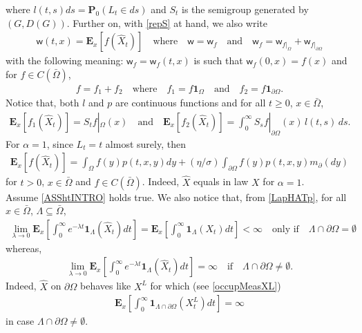 \documentclass[11pt,a4paper]{article}
\begin{document}
where $l(t,s)ds = \mathbf{P}_0(L_t \in ds)$ and $S_t$ is the semigroup generated by $(G, D(G))$. Further on, with \eqref{repS} at hand, we also write
\begin{align}
\label{wXhatLaw} 
\mathsf{w}(t,x) = \mathbf{E}_x[f(\hat{X}_t)] \quad \textrm{where} \quad \mathsf{w}=\mathsf{w}_f \quad \textrm{and} \quad  \mathsf{w}_f = \mathsf{w}_{f|_\Omega} + \mathsf{w}_{f|_{\partial \Omega}}
\end{align}
with the following meaning:  $\mathsf{w}_f=\mathsf{w}_f(t,x)$ is such that $\mathsf{w}_f(0,x) = f(x)$ and for $f \in C(\bar{\Omega})$, 
\begin{align}
\label{repf12}
f = f_1 + f_2 \quad \textrm{where} \quad  f_1 = f \mathbf{1}_\Omega \quad \textrm{and} \quad f_2 = f \mathbf{1}_{\partial \Omega}.
\end{align}
Notice that, both $l$ and $p$ are continuous functions and for all $t\geq 0$, $x \in \bar{\Omega}$,
\begin{align*}
\mathbf{E}_x[f_1(\hat{X}_t)] = S_t f|_{\Omega}(x) \quad \textrm{and} \quad \mathbf{E}_x[f_2(\hat{X}_t)] = \int_0^\infty  S_s f|_{\partial \Omega} (x)\,l(t,s)\, ds.
\end{align*} 
For $\alpha=1$, since $L_t=t$ almost surely, then 
\begin{align*}
\mathbf{E}_x[f(\hat{X}_t)] = \int_\Omega f(y) p(t,x,y) dy + (\eta/\sigma) \int_{\partial \Omega} f(y) p(t,x,y) m_\partial(dy) 
\end{align*} 
for $t>0$, $x \in \bar{\Omega}$ and $f \in C(\bar{\Omega})$. Indeed, $\hat{X}$ equals in law $X$ for $\alpha=1$. \\


Assume \eqref{ASShtINTRO} holds true. We also notice that, from \eqref{LapHATp}, for all $x \in \bar{\Omega}$, $\Lambda \subseteq \bar{\Omega}$,
\begin{align*}
\lim_{\lambda \to 0} \mathbf{E}_x \left[ \int_0^\infty e^{-\lambda t}\mathbf{1}_\Lambda(\hat{X}_t) dt \right] = \mathbf{E}_x \left[ \int_0^\infty \mathbf{1}_\Lambda(X_t) dt \right] < \infty \quad \textrm{only if} \quad \Lambda \cap \partial \Omega = \emptyset
\end{align*}
whereas, 
\begin{align}
\lim_{\lambda \to 0} \mathbf{E}_x \left[ \int_0^\infty e^{-\lambda t}\mathbf{1}_\Lambda(\hat{X}_t) dt \right] = \infty \quad \textrm{if} \quad \Lambda \cap \partial \Omega \neq \emptyset.
\label{occupMeasXhat}
\end{align}
Indeed, $\hat{X}$ on $\partial \Omega$ behaves like $X^L$ for which (see \eqref{occupMeasXL})
\begin{align*}
\mathbf{E}_x \left[ \int_0^\infty \mathbf{1}_{\Lambda\cap \partial \Omega}(X^L_t) dt \right] = \infty
\end{align*}
in case $\Lambda \cap \partial \Omega \neq \emptyset$.\\
\end{document}
